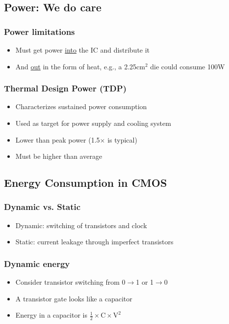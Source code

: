 \documentclass[11pt]{article}
\begin{document}
\subsection{Power: We do care}
\subsubsection{Power limitations}
\begin{itemize}
    \item Must get power \underline{into} the IC and distribute it
    \item And \underline{out} in the form of heat, e.g., a 2.25cm\(^2\) die could consume 100W
\end{itemize}

\subsubsection{Thermal Design Power (TDP)}
\begin{itemize}
    \item Characterizes sustained power consumption
    \item Used as target for power supply and cooling system
    \item Lower than peak power (1.5\(\times\) is typical)
    \item Must be higher than average
\end{itemize}

\subsection{Energy Consumption in CMOS}
\subsubsection{Dynamic vs. Static}
\begin{itemize}
    \item Dynamic: switching of transistors and clock
    \item Static: current leakage through imperfect transistors
\end{itemize}
\subsubsection{Dynamic energy}
\begin{itemize}
    \item Consider transistor switching from 0\(\rightarrow\)1 or 1\(\rightarrow\)0
    \item A transistor gate looks like a capacitor
    \item Energy in a capacitor is \( \frac{1}{2} \times \text{C}  \times \text{V}^2 \)
\end{itemize}
\end{document}
